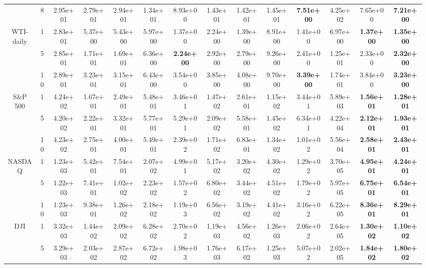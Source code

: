 \begin{table*}[!t]
{\begin{tabular}{cccccccccccccc}
 & 8& 2.95e+01& 2.79e+01 & 2.94e+01 & 1.34e+01 & 8.93e+00& 1.43e+01& 1.42e+01 & 1.45e+01 & \textbf{7.51e+00} & 4.25e+02 & 7.65e+00& \textbf{7.21e+00}\s \\ \cmidrule(l){2-14}
\multirowcell{3}{WTI-\\daily} & 1& 2.83e+01& 5.37e+00 & 5.43e+00 & 5.97e+00 & 1.37e+00& 2.24e+00& 1.39e+00 & 8.91e+00 & 1.41e+00& 6.97e+00 & \textbf{1.37e+00} & \textbf{1.35e+00}\s \\ \cmidrule(l){3-14}
 & 5& 2.85e+01& 1.71e+01 & 1.69e+01 & 6.36e+00 & \textbf{2.24e+00}\s & 2.92e+00& 2.79e+00 & 9.26e+00 & 2.41e+00& 1.25e+01 & 2.33e+00& \textbf{2.32e+00} \\ \cmidrule(l){3-14}
 & 10 & 2.89e+01& 3.23e+01 & 3.15e+01 & 6.43e+00 & 3.54e+00& 3.85e+00& 4.08e+00 & 9.70e+00 & \textbf{3.39e+00} & 1.74e+01 & 3.84e+00& \textbf{3.23e+00}\s \\ \cmidrule(l){2-14}
\multirow{3}{*}{S\&P 500}& 1& 4.24e+02& 1.67e+01 & 2.49e+01 & 5.48e+01 & 3.46e+01& 1.47e+02& 2.61e+01 & 1.15e+02 & 3.44e+01& 5.89e+03 & \textbf{1.56e+01} & \textbf{1.28e+01}\s \\ \cmidrule(l){3-14}
 & 5& 4.20e+02& 2.22e+01 & 3.32e+01 & 5.77e+01 & 5.29e+01& 2.09e+02& 5.58e+01 & 1.45e+02 & 6.34e+01& 4.22e+04 & \textbf{2.12e+01} & \textbf{1.93e+01}\s \\ \cmidrule(l){3-14}
 & 10 & 4.23e+02& 2.75e+01 & 4.00e+01 & 5.49e+01 & 2.39e+02& 1.71e+02& 6.83e+01 & 1.34e+02 & 1.01e+02& 5.56e+04 & \textbf{2.58e+01} & \textbf{2.43e+01}\s \\ \cmidrule(l){2-14}
\multirow{3}{*}{NASDAQ}& 1& 1.23e+03& 5.42e+01 & 7.54e+01 & 2.07e+02 & 4.99e+01& 5.17e+02& 3.20e+02 & 4.30e+02 & 1.29e+02& 3.70e+05 & \textbf{4.95e+01} & \textbf{4.24e+01}\s \\ \cmidrule(l){3-14}
 & 5& 1.22e+03& 7.41e+01 & 1.02e+02 & 2.23e+02 & 1.57e+02& 6.80e+02& 3.44e+02 & 4.51e+02 & 1.79e+02& 5.97e+05 & \textbf{6.75e+01} & \textbf{6.54e+01}\s \\ \cmidrule(l){3-14}
 & 10 & 1.23e+03& 9.38e+01 & 1.26e+02 & 2.18e+02 & 1.19e+03& 6.56e+02& 3.19e+02 & 4.41e+02 & 3.16e+02& 6.22e+05 & \textbf{8.36e+01} & \textbf{8.29e+01}\s \\ \cmidrule(l){2-14}
\multirow{3}{*}{DJI} & 1& 3.32e+03& 1.44e+02 & 2.09e+02 & 6.28e+02 & 2.70e+02& 1.19e+03& 4.56e+02 & 1.26e+03 & 2.06e+02& 2.64e+05 & \textbf{1.30e+02} & \textbf{1.10e+02}\s \\ \cmidrule(l){3-14}
 & 5& 3.29e+03& 2.03e+02 & 2.87e+02 & 6.72e+02 & 1.98e+03& 1.76e+03& 6.17e+02 & 1.25e+03 & 5.07e+02& 2.02e+05 & \textbf{1.84e+02} & \textbf{1.80e+02}\s \\ \cmidrule(l){3-14}

\end{tabular}}
\end{table*}
